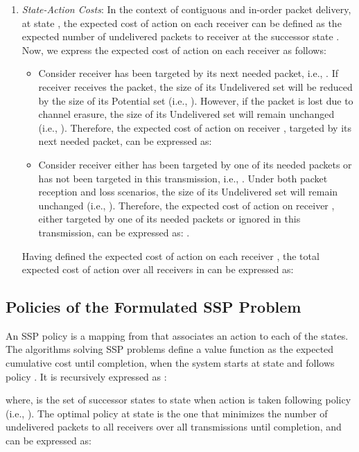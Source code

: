 \documentclass[12pt, peerreview, onecolumn]{IEEEtran}
\begin{document}
\begin{enumerate}
\item \emph{State-Action Costs}: In the context of  contiguous and  in-order packet delivery,   at  state ,   the  expected cost of  action   on each  receiver  can be defined as the expected  number of undelivered packets to  receiver  at the successor state . Now, we  express the expected cost of action  on each receiver   as follows:

   \begin{itemize}
   \item  Consider  receiver    has  been targeted by its next needed packet, i.e., . If receiver    receives the packet, the size of its  Undelivered set  will be reduced by the size of its  Potential set  (i.e., ).   However, if the packet is lost  due to channel erasure, the size of its Undelivered set  will remain  unchanged  (i.e., ).  Therefore, the expected cost of action  on receiver , targeted by its next needed packet, can be expressed as:
         

   \item  Consider receiver  either has been targeted by one of its needed packets or has not been targeted in this transmission, i.e., . Under both packet reception and loss scenarios,  the size of its Undelivered set will remain unchanged (i.e., ). Therefore, the expected cost of action  on receiver , either  targeted by one of its  needed packets or ignored in this transmission, can be expressed as: .


\end{itemize}

 Having defined the expected  cost of  action  on each receiver , the total expected cost of   action  over all receivers in   can be expressed as:
  
\end{enumerate}


\vspace{-5mm}
\subsection{Policies of the Formulated SSP Problem} \label{SSPproperties}
An SSP policy  is a mapping from   that associates an action to each of the states.  The algorithms solving SSP problems define a value function  as the expected cumulative cost until completion, when the system starts at state  and follows policy . It is recursively expressed  as \cite{puterman2009markov}:

where,  is the set of successor states to state   when action  is taken following policy  (i.e., ). The optimal policy  at  state  is the one that minimizes the number of  undelivered packets to all receivers over all transmissions until completion, and  can be expressed  as:
\end{document}
